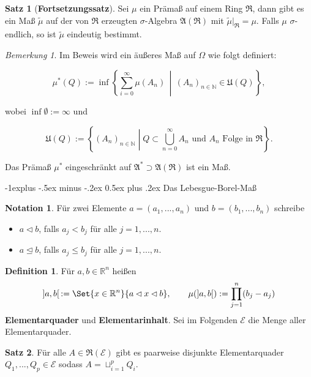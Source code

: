 \documentclass[a4paper,10pt,landscape]{article}
\makeatletter
\newcommand{\R}{\mathbb{R}}
\newcommand{\N}{\mathbb{N}}
\newcommand{\Alg}{\mathfrak{A}}
\newcommand{\Ring}{\mathfrak{R}}
\theoremstyle{definition}
\newtheorem*{nota}{Notation}
\newtheorem*{defn}{Definition}
\newtheorem*{satz}{Satz}
\theoremstyle{remark}
\newtheorem*{bem}{Bemerkung}
\renewcommand{\emph}[1]{\textcolor{Emph}{\bf{#1}}}
\renewcommand{\subsection}{\@startsection{subsection}{2}{0mm}%
                                {-1explus -.5ex minus -.2ex}%
                                {0.5ex plus .2ex}%
                                {\normalfont\normalsize\bfseries}}
\makeatother
\begin{document}
\begin{multicols}{3}
\begin{satz}[\emph{Fortsetzungssatz}]
  Sei $\mu$ ein Prämaß auf einem Ring $\Ring$, dann gibt es ein Maß $\tilde{\mu}$ auf der von $\Ring$ erzeugten $\sigma$-Algebra $\Alg(\Ring)$ mit $\tilde{\mu}|_\Ring = \mu$. Falls $\mu$ $\sigma$-endlich, so ist $\tilde{\mu}$ eindeutig bestimmt.
\end{satz}

\begin{samepage} %

\begin{bem}
  Im Beweis wird ein äußeres Maß auf $\Omega$ wie folgt definiert:

  \[ \mu^*(Q) := \inf \left\{ \sum_{i = 0}^\infty \mu(A_n) \,\middle|\, (A_n)_{n \in \N} \in \mathfrak{U}(Q) \right\}, \]

  wobei $\inf \emptyset := \infty$ und

  \[ \mathfrak{U}(Q) := \left\{ (A_n)_{n \in \N} \middle| Q \subset \bigcup_{n = 0}^\infty A_n \text{ und } A_n \text{ Folge in } \Ring \right\}. \]

  Das Prämaß $\mu^*$ eingeschränkt auf $\Alg^* \supset \Alg(\Ring)$ ist ein Maß.
\end{bem}

\subsection{Das Lebesgue-Borel-Maß}

\end{samepage}

\begin{nota}
  Für zwei Elemente $a = (a_1, ..., a_n)$ und $b = (b_1, ..., b_n)$ schreibe
  \begin{itemize}
    \item $a \lhd b$, falls $a_j < b_j$ für alle $j = 1, ..., n$.
    \item $a \unlhd b$, falls $a_j \leq b_j$ für alle $j = 1, ..., n$.
  \end{itemize}
\end{nota}

\begin{defn}
  Für $a, b \in \R^n$ heißen
  \[
    ]a, b[\,:= \Set{ x \in \R^n }{ a \lhd x \lhd b }, \qquad
    \mu(]a, b[) := \prod_{j = 1}^{n} (b_j - a_j)
  \]
  \emph{Elementarquader} und \emph{Elementarinhalt}. Sei im Folgenden $\mathcal{E}$ die Menge aller Elementarquader.
\end{defn}

\begin{satz}
  Für alle $A \in \Ring(\mathcal{E})$ gibt es paarweise disjunkte Elementarquader $Q_1, ..., Q_p \in \mathcal{E}$ sodass $A = \sqcup_{i = 1}^p Q_i$.
\end{satz}


\end{multicols}
\end{document}
